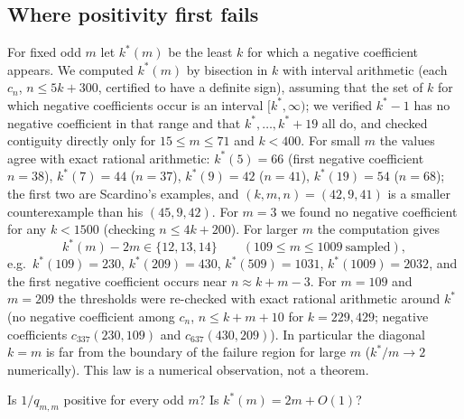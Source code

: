 \subsection{Where positivity first fails}\label{sec:kstar}
For fixed odd $m$ let $k^*(m)$ be the least $k$ for which a negative coefficient appears. We computed $k^*(m)$ by bisection in $k$ with interval arithmetic (each $c_n$, $n\le5k+300$, certified to have a definite sign), assuming that the set of $k$ for which negative coefficients occur is an interval $[k^*,\infty)$; we verified $k^*-1$ has no negative coefficient in that range and that $k^*,\dots,k^*+19$ all do, and checked contiguity directly only for $15\le m\le71$ and $k<400$. For small $m$ the values agree with exact rational arithmetic: $k^*(5)=66$ (first negative coefficient $n=38$), $k^*(7)=44$ ($n=37$), $k^*(9)=42$ ($n=41$), $k^*(19)=54$ ($n=68$); the first two are Scardino's examples, and $(k,m,n)=(42,9,41)$ is a smaller counterexample than his $(45,9,42)$. For $m=3$ we found no negative coefficient for any $k<1500$ (checking $n\le4k+200$). For larger $m$ the computation gives
\[
k^*(m)-2m\in\{12,13,14\}\qquad(109\le m\le 1009\ \text{sampled}),
\]
e.g.\ $k^*(109)=230$, $k^*(209)=430$, $k^*(509)=1031$, $k^*(1009)=2032$, and the first negative coefficient occurs near $n\approx k+m-3$. For $m=109$ and $m=209$ the thresholds were re-checked with exact rational arithmetic around $k^*$ (no negative coefficient among $c_n$, $n\le k+m+10$ for $k=229,429$; negative coefficients $c_{337}(230,109)$ and $c_{637}(430,209)$). In particular the diagonal $k=m$ is far from the boundary of the failure region for large $m$ ($k^*/m\to2$ numerically). This law is a numerical observation, not a theorem.

\begin{question}
Is $1/q_{m,m}$ positive for every odd $m$? Is $k^*(m)=2m+O(1)$?
\end{question}
